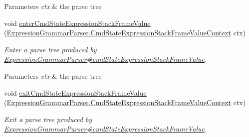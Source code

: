 \begin{DoxyCompactItemize}
\begin{DoxyCompactList}
\begin{DoxyParams}{Parameters}
{\em ctx} & the parse tree\\
\hline
\end{DoxyParams}
 \end{DoxyCompactList}\item 
void \hyperlink{classgov_1_1nasa_1_1jpf_1_1inspector_1_1server_1_1expression_1_1parser_1_1_expression_grammar_base_listener_a27b5e088d6b4dea08877f3830b34ea75}{enter\+Cmd\+State\+Expression\+Stack\+Frame\+Value} (\hyperlink{classgov_1_1nasa_1_1jpf_1_1inspector_1_1server_1_1expression_1_1parser_1_1_expression_grammar_pa27eac9bb10e329b6f1427633e5ce16ca}{Expression\+Grammar\+Parser.\+Cmd\+State\+Expression\+Stack\+Frame\+Value\+Context} ctx)
\begin{DoxyCompactList}\small\item\em Enter a parse tree produced by \hyperlink{classgov_1_1nasa_1_1jpf_1_1inspector_1_1server_1_1expression_1_1parser_1_1_expression_grammar_parser_a61b18a81f2b5ca691f9645b3a1fb203c}{Expression\+Grammar\+Parser\#cmd\+State\+Expression\+Stack\+Frame\+Value}.


\begin{DoxyParams}{Parameters}
{\em ctx} & the parse tree\\
\hline
\end{DoxyParams}
 \end{DoxyCompactList}\item 
void \hyperlink{classgov_1_1nasa_1_1jpf_1_1inspector_1_1server_1_1expression_1_1parser_1_1_expression_grammar_base_listener_ae2c208db7499afee474a1eaf77e31d34}{exit\+Cmd\+State\+Expression\+Stack\+Frame\+Value} (\hyperlink{classgov_1_1nasa_1_1jpf_1_1inspector_1_1server_1_1expression_1_1parser_1_1_expression_grammar_pa27eac9bb10e329b6f1427633e5ce16ca}{Expression\+Grammar\+Parser.\+Cmd\+State\+Expression\+Stack\+Frame\+Value\+Context} ctx)
\begin{DoxyCompactList}\small\item\em Exit a parse tree produced by \hyperlink{classgov_1_1nasa_1_1jpf_1_1inspector_1_1server_1_1expression_1_1parser_1_1_expression_grammar_parser_a61b18a81f2b5ca691f9645b3a1fb203c}{Expression\+Grammar\+Parser\#cmd\+State\+Expression\+Stack\+Frame\+Value}.



\end{DoxyCompactList}
\end{DoxyCompactItemize}
